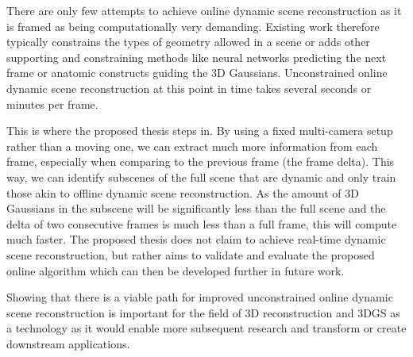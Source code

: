 There are only few attempts to achieve online dynamic scene reconstruction as it is framed as being computationally very demanding. Existing work therefore typically constrains the types of geometry allowed in a scene or adds other supporting and constraining methods like neural networks predicting the next frame or anatomic constructs guiding the 3D Gaussians. Unconstrained online dynamic scene reconstruction at this point in time takes several seconds or minutes per frame.

This is where the proposed thesis steps in. By using a fixed multi-camera setup rather than a moving one, we can extract much more information from each frame, especially when comparing to the previous frame (the frame delta). 
This way, we can identify subscenes of the full scene that are dynamic and only train those akin to offline dynamic scene reconstruction. As the amount of 3D Gaussians in the subscene will be significantly less than the full scene and the delta of two consecutive frames is much less than a full frame, this will compute much faster.
The proposed thesis does not claim to achieve real-time dynamic scene reconstruction, but rather aims to validate and evaluate the proposed online algorithm which can then be developed further in future work.

Showing that there is a viable path for improved unconstrained online dynamic scene reconstruction is important for the field of 3D reconstruction and 3DGS as a technology as it would enable more subsequent research and transform or create downstream applications.